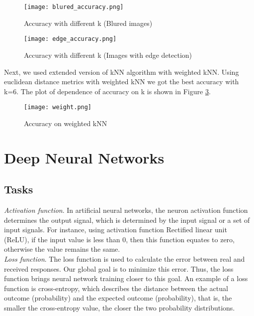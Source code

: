 \documentclass[a4paper, twoside, english]{article}
\begin{document}
\begin{figure}[h!]
	\centerline{\texttt{[image: blured\_accuracy.png]}}
	\caption[classes]{Accuracy with different k (Blured images)}
	\label{fig:acc_blur}
\end{figure}

\begin{figure}[h!]
	\centerline{\texttt{[image: edge\_accuracy.png]}}
	\caption[classes]{Accuracy with different k (Images with edge detection)}
	\label{fig:acc_edge}
\end{figure}
\newpage
Next, we used extended version of kNN algorithm with weighted kNN. Using euclidean distance metrics with weighted kNN we got the best accuracy with k=6. The plot of dependence of accuracy on k is shown in Figure \ref{fig:acc_KNN}.\\

\begin{figure}[h!]
	\centerline{\texttt{[image: weight.png]}}
	\caption[classes]{Accuracy on weighted kNN}
	\label{fig:acc_KNN}
\end{figure}




\newpage
\section{Deep Neural Networks}
\subsection{Tasks}
\textit{Activation function}. In artificial neural networks, the neuron activation function determines the output signal, which is determined by the input signal or a set of input signals. For instance, using activation function Rectified linear unit (ReLU), if the input value is less than 0, then this function equates to zero, otherwise the value remains the same.\\

\textit{Loss function}. The loss function is used to calculate the error between real and received responses. Our global goal is to minimize this error. Thus, the loss function brings neural network training closer to this goal. An example of a loss function is cross-entropy, which describes the distance between the actual outcome (probability) and the expected outcome (probability), that is, the smaller the cross-entropy value, the closer the two probability distributions.\\
\end{document}
